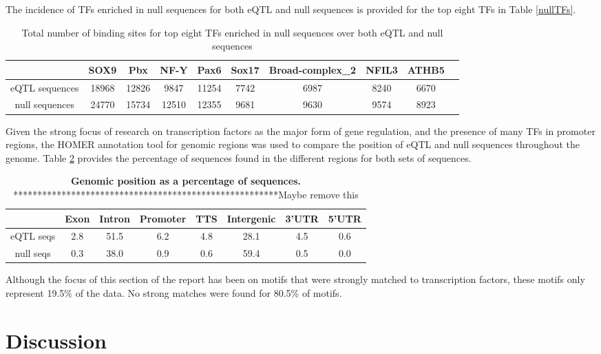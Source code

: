 \documentclass[12pt]{article}
\begin{document}
The incidence of TFs enriched in null sequences for both eQTL and null sequences is provided for the top eight TFs in Table \ref{nullTFs}.

\begin{table}[!htbp]
\caption{Total number of binding sites for top eight TFs enriched in null sequences over both eQTL and null sequences}
\label{TFnos}
\centering
\begin{tabular}{cccccccccc}
\toprule[0.2em]
&SOX9&Pbx&NF-Y&Pax6&Sox17&Broad-complex{\_}2&NFIL3&ATHB5\\
\midrule[0.1em]
eQTL sequences&18968&12826&9847&11254&7742&6987&8240&6670\\
null sequences&24770&15734&12510&12355&9681&9630&9574&8923\\
 \bottomrule[0.2em]
\end{tabular}
\end{table}



\newpage

Given the strong focus of research on transcription factors as the major form of gene regulation, and the presence of many TFs in promoter regions, the HOMER annotation tool for genomic regions was used to compare the position of eQTL and null sequences throughout the genome. Table \ref{genomicPosition} provides the percentage of sequences found in the different regions for both sets of sequences.

\begin{table}
\caption{{\bf Genomic position as a percentage of sequences.} *******************************************************{Maybe remove this}}
\label{genomicPosition}
\centering
\begin{tabular}{|c|c|c|c|c|c|c|c|}
\hline
& Exon & Intron & Promoter & TTS & Intergenic & 3'UTR & 5'UTR\\
\hline
eQTL seqs & 2.8 & 51.5 & 6.2 & 4.8 & 28.1 & 4.5 & 0.6\\
\hline
null seqs & 0.3 & 38.0 & 0.9 & 0.6 & 59.4 & 0.5 & 0.0\\
\hline
\end{tabular}
\end{table}

Although the focus of this section of the report has been on motifs that were strongly matched to transcription factors, these motifs only represent 19.5\% of the data. No strong matches were found for 80.5\% of motifs. 



\section{Discussion}
\end{document}
